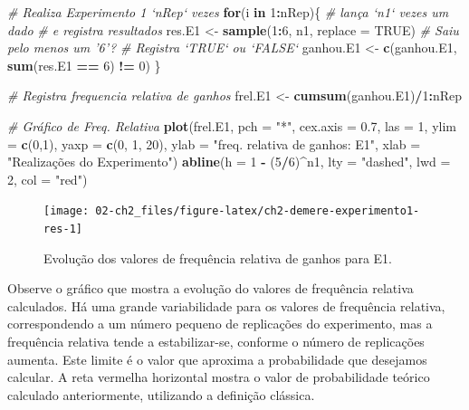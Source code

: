 \documentclass[
]{book}
\newenvironment{Shaded}{\begin{snugshade}}{\end{snugshade}}
\newcommand{\CommentTok}[1]{\textcolor[rgb]{0.56,0.35,0.01}{\textit{#1}}}
\newcommand{\ControlFlowTok}[1]{\textcolor[rgb]{0.13,0.29,0.53}{\textbf{#1}}}
\newcommand{\DataTypeTok}[1]{\textcolor[rgb]{0.13,0.29,0.53}{#1}}
\newcommand{\DecValTok}[1]{\textcolor[rgb]{0.00,0.00,0.81}{#1}}
\newcommand{\FloatTok}[1]{\textcolor[rgb]{0.00,0.00,0.81}{#1}}
\newcommand{\KeywordTok}[1]{\textcolor[rgb]{0.13,0.29,0.53}{\textbf{#1}}}
\newcommand{\NormalTok}[1]{#1}
\newcommand{\OperatorTok}[1]{\textcolor[rgb]{0.81,0.36,0.00}{\textbf{#1}}}
\newcommand{\OtherTok}[1]{\textcolor[rgb]{0.56,0.35,0.01}{#1}}
\newcommand{\StringTok}[1]{\textcolor[rgb]{0.31,0.60,0.02}{#1}}
\theoremstyle{definition}
\theoremstyle{definition}
\theoremstyle{definition}
\theoremstyle{remark}
\begin{document}
\begin{Shaded}
\begin{Highlighting}[]
\CommentTok{# Realiza Experimento 1 `nRep` vezes}
\ControlFlowTok{for}\NormalTok{(i }\ControlFlowTok{in} \DecValTok{1}\OperatorTok{:}\NormalTok{nRep)\{}
  \CommentTok{# lança `n1`  vezes um dado }
  \CommentTok{# e registra resultados}
\NormalTok{  res.E1 <-}\StringTok{ }\KeywordTok{sample}\NormalTok{(}\DecValTok{1}\OperatorTok{:}\DecValTok{6}\NormalTok{, n1, }\DataTypeTok{replace =} \OtherTok{TRUE}\NormalTok{)  }
  \CommentTok{# Saiu pelo menos um '6'? }
  \CommentTok{# Registra `TRUE` ou `FALSE`}
\NormalTok{  ganhou.E1 <-}\StringTok{ }\KeywordTok{c}\NormalTok{(ganhou.E1, }\KeywordTok{sum}\NormalTok{(res.E1 }\OperatorTok{==}\StringTok{ }\DecValTok{6}\NormalTok{) }\OperatorTok{!=}\StringTok{ }\DecValTok{0}\NormalTok{)}
\NormalTok{\}}

\CommentTok{# Registra frequencia relativa de ganhos    }
\NormalTok{frel.E1 <-}\StringTok{ }\KeywordTok{cumsum}\NormalTok{(ganhou.E1)}\OperatorTok{/}\DecValTok{1}\OperatorTok{:}\NormalTok{nRep}

\CommentTok{# Gráfico de Freq. Relativa}
\KeywordTok{plot}\NormalTok{(frel.E1, }\DataTypeTok{pch =} \StringTok{"*"}\NormalTok{, }\DataTypeTok{cex.axis =} \FloatTok{0.7}\NormalTok{, }\DataTypeTok{las =} \DecValTok{1}\NormalTok{, }
     \DataTypeTok{ylim =} \KeywordTok{c}\NormalTok{(}\DecValTok{0}\NormalTok{,}\DecValTok{1}\NormalTok{), }\DataTypeTok{yaxp =} \KeywordTok{c}\NormalTok{(}\DecValTok{0}\NormalTok{, }\DecValTok{1}\NormalTok{, }\DecValTok{20}\NormalTok{),}
     \DataTypeTok{ylab =} \StringTok{"freq. relativa de ganhos: E1"}\NormalTok{, }\DataTypeTok{xlab =} \StringTok{"Realizações do Experimento"}\NormalTok{)}
\KeywordTok{abline}\NormalTok{(}\DataTypeTok{h =} \DecValTok{1} \OperatorTok{-}\StringTok{ }\NormalTok{(}\DecValTok{5}\OperatorTok{/}\DecValTok{6}\NormalTok{)}\OperatorTok{^}\NormalTok{n1,  }\DataTypeTok{lty =} \StringTok{"dashed"}\NormalTok{, }\DataTypeTok{lwd =} \DecValTok{2}\NormalTok{, }\DataTypeTok{col =} \StringTok{"red"}\NormalTok{)}
\end{Highlighting}
\end{Shaded}

\begin{figure}
\texttt{[image: 02-ch2\_files/figure-latex/ch2-demere-experimento1-res-1]} \caption{Evolução dos valores de frequência relativa de ganhos para E1.}\label{fig:ch2-demere-experimento1-res}
\end{figure}

Observe o gráfico que mostra a evolução do valores de frequência relativa calculados. Há uma grande variabilidade para os valores de frequência relativa, correspondendo a um número pequeno de replicações do experimento, mas a frequência relativa tende a estabilizar-se, conforme o número de replicações aumenta. Este limite é o valor que aproxima a probabilidade que desejamos calcular. A reta vermelha horizontal mostra o valor de probabilidade teórico calculado anteriormente, utilizando a definição clássica.
\end{document}
